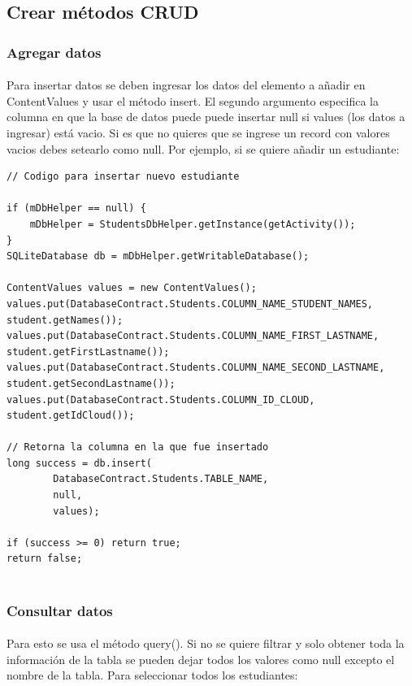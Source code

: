\documentclass[10pt]{extarticle}
\begin{document}
\subsection{Crear métodos CRUD}

\subsubsection{Agregar datos}
\paragraph{}
Para insertar datos se deben ingresar los datos del elemento a añadir en ContentValues y usar el método insert. El segundo argumento especifica la columna en que la base de datos puede puede insertar null si values (los datos a ingresar) está vacio. Si es que no quieres que se ingrese un record con valores vacios debes setearlo como null. Por ejemplo, si se quiere añadir un estudiante:
	
\begin{lstlisting}
// Codigo para insertar nuevo estudiante

if (mDbHelper == null) {
    mDbHelper = StudentsDbHelper.getInstance(getActivity());
}
SQLiteDatabase db = mDbHelper.getWritableDatabase();

ContentValues values = new ContentValues();
values.put(DatabaseContract.Students.COLUMN_NAME_STUDENT_NAMES, student.getNames());
values.put(DatabaseContract.Students.COLUMN_NAME_FIRST_LASTNAME, student.getFirstLastname());
values.put(DatabaseContract.Students.COLUMN_NAME_SECOND_LASTNAME, student.getSecondLastname());
values.put(DatabaseContract.Students.COLUMN_ID_CLOUD, student.getIdCloud());

// Retorna la columna en la que fue insertado
long success = db.insert(
        DatabaseContract.Students.TABLE_NAME, 
        null,								  
        values);
        
if (success >= 0) return true;
return false;
     
\end{lstlisting}

\subsubsection{Consultar datos}
\paragraph{}
Para esto se usa el método query(). Si no se quiere filtrar y solo obtener toda la información de la tabla se pueden dejar todos los valores como null excepto el nombre de la tabla. Para seleccionar todos los estudiantes:
\end{document}
